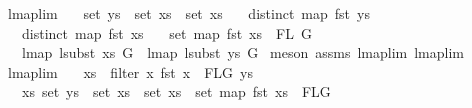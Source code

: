 \begin{isabellebody}
%
\isadelimproof
\isanewline
%
\endisadelimproof
\isanewline
\isanewline
{}\isamarkupfalse%
\ lmap{\isacharunderscore}{\kern0pt}lim{}{\isacharcolon}{\kern0pt}\isanewline
\ \ \ {\isachardoublequoteopen}set\ ys\ {\isacharequal}{\kern0pt}\ set\ xs{}\ {\isasymunion}\ set\ xs{}{\isachardoublequoteclose}\isanewline
\ \ \ {\isachardoublequoteopen}distinct\ {\isacharparenleft}{\kern0pt}map\ fst\ ys{\isacharparenright}{\kern0pt}{\isachardoublequoteclose}\isanewline
\ \ \ {\isachardoublequoteopen}distinct\ {\isacharparenleft}{\kern0pt}map\ fst\ xs{}{\isacharparenright}{\kern0pt}{\isachardoublequoteclose}\isanewline
\ \ \ {\isachardoublequoteopen}set\ {\isacharparenleft}{\kern0pt}map\ fst\ xs{}{\isacharparenright}{\kern0pt}\ {\isasyminter}\ FL\ G\ {\isacharequal}{\kern0pt}\ {\isacharbraceleft}{\kern0pt}{\isacharbraceright}{\kern0pt}{\isachardoublequoteclose}\isanewline
\ \ \ {\isachardoublequoteopen}lmap\ {\isacharparenleft}{\kern0pt}lsubst\ xs{}{\isacharparenright}{\kern0pt}\ G\ {\isacharequal}{\kern0pt}\ lmap\ {\isacharparenleft}{\kern0pt}lsubst\ ys{\isacharparenright}{\kern0pt}\ G{\isachardoublequoteclose}\isanewline
%
\isadelimproof
%
\endisadelimproof
%
\isatagproof
{}\isamarkupfalse%
\ {\isacharparenleft}{\kern0pt}meson\ assms{\isacharparenleft}{\kern0pt}{}{\isacharcomma}{\kern0pt}{}{\isacharcomma}{\kern0pt}{}{\isacharcomma}{\kern0pt}{}{\isacharparenright}{\kern0pt}\ lmap{\isacharunderscore}{\kern0pt}lim\ lmap{\isacharunderscore}{\kern0pt}lim{}{\isacharparenright}{\kern0pt}%
\endisatagproof
{\isafoldproof}%
%
\isadelimproof
\isanewline
%
\endisadelimproof
\isanewline
\isanewline
\isanewline
{}\isamarkupfalse%
\ lmap{\isacharunderscore}{\kern0pt}lim{}{\isacharcolon}{\kern0pt}\isanewline
\ \ \ {\isachardoublequoteopen}xs\ {\isacharequal}{\kern0pt}\ filter\ {\isacharparenleft}{\kern0pt}{\isasymlambda}x{\isachardot}{\kern0pt}\ fst\ x\ {\isasymin}\ FLG{\isacharparenright}{\kern0pt}\ ys{\isachardoublequoteclose}\isanewline
\ \ \ {\isachardoublequoteopen}{\isasymexists}xs{}{\isachardot}{\kern0pt}\ {\isacharparenleft}{\kern0pt}set\ ys\ {\isacharequal}{\kern0pt}\ set\ xs{}\ {\isasymunion}\ set\ xs\ {\isasymand}\ set\ {\isacharparenleft}{\kern0pt}map\ fst\ xs{}{\isacharparenright}{\kern0pt}\ {\isasyminter}\ FLG\ {\isacharequal}{\kern0pt}\ {\isacharbraceleft}{\kern0pt}{\isacharbraceright}{\kern0pt}{\isacharparenright}{\kern0pt}{\isachardoublequoteclose}\isanewline

\end{isabellebody}
